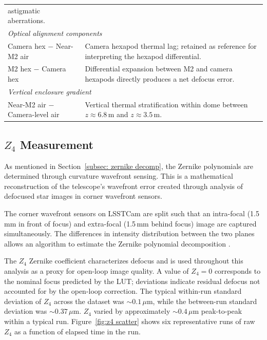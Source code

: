 \documentclass[SE,authoryear,toc]{lsstdoc}
\begin{document}
\begin{table}[htbp]
\begin{tabular}{l >{\raggedright\arraybackslash}p{6.5cm}}
      astigmatic aberrations. \\[6pt]
\multicolumn{2}{l}{\textit{Optical alignment components}} \\[2pt]
Camera hex $-$ Near-M2 air
    & Camera hexapod thermal lag; retained as reference for interpreting
      the hexapod differential. \\[3pt]
M2 hex $-$ Camera hex
    & Differential expansion between M2 and camera hexapods directly
      produces a net defocus error. \\[6pt]
\multicolumn{2}{l}{\textit{Vertical enclosure gradient}} \\[2pt]
Near-M2 air $-$ Camera-level air
    & Vertical thermal stratification within dome between $z \approx 6.8$\,m
      and $z \approx 3.5$\,m. \\
\bottomrule
\end{tabular}
\end{table}



\subsection{$Z_4$ Measurement}
\label{subsec:z4 Measurement} 

As mentioned in Section~\ref{subsec: zernike decomp}, the Zernike polynomials are determined through curvature wavefront sensing. This is a mathematical reconstruction of the telescope's wavefront error created through analysis of defocused star images in corner wavefront sensors. 

The corner wavefront sensors on LSSTCam are split such that an intra-focal (1.5\,mm in front of focus) and extra-focal (1.5\,mm behind focus) image are captured simultaneously. The differences in intensity distribution between the two planes allows an algorithm to estimate the Zernike polynomial decomposition \citep{Xin2015}.

The $Z_4$ Zernike coefficient characterizes defocus and is used throughout this analysis as a proxy for open-loop image quality. A value of $Z_4 = 0$ corresponds to the nominal focus predicted by the LUT; deviations indicate residual defocus not accounted for by the open-loop correction. The typical within-run standard deviation of $Z_4$ across the dataset was $\sim 0.1\,\mu\mathrm{m}$, while the between-run standard deviation was $\sim0.37\,\mu\mathrm{m}$. $Z_4$ varied by approximately $\sim0.4\,\mu\mathrm{m}$ peak-to-peak within a typical run. Figure~\ref{fig:z4 scatter} shows six representative runs of raw $Z_4$ as a function of elapsed time in the run. 
\end{document}
